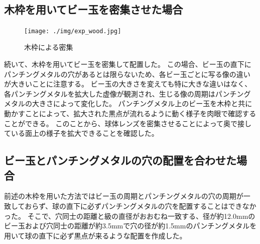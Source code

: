 \begin{figure}[htbp]
  \centering
{}
\\
  \caption{}
  \label{FExpSingle}
\end{figure}

\subsection{木枠を用いてビー玉を密集させた場合}
\label{SSWoodframe}

\begin{figure}[htbp]
  \centering
  \texttt{[image: ./img/exp\_wood.jpg]}
  \caption{木枠による密集}
  \label{FExpWood}
\end{figure}

続いて、木枠を用いてビー玉を密集して配置した。
この場合、ビー玉の直下にパンチングメタルの穴があるとは限らないため、各ビー玉ごとに写る像の違いが大きいことに注意する。
ビー玉の大きさを変えても特に大きな違いはなく、各パンチングメタルを拡大した虚像が観測され、生じる像の周期はパンチングメタルの大きさによって変化した。
パンチングメタル上のビー玉を木枠と共に動かすことによって、拡大された黒点が流れるように動く様子を肉眼で確認することができる。
このことから、球体レンズを密集させることによって奥で接している面上の様子を拡大できることを確認した。

\subsection{ビー玉とパンチングメタルの穴の配置を合わせた場合}
\label{SSMarbleOnHole}
前述の木枠を用いた方法ではビー玉の周期とパンチングメタルの穴の周期が一致しておらず、球の直下に必ずパンチングメタルの穴を配置することはできなかった。
そこで、穴同士の距離と級の直径がおおむね一致する、径が約12.0mmのビー玉および穴同士の距離が約3.5mmで穴の径が約1.5mmのパンチングメタルを用いて球の直下に必ず黒点が来るような配置を作成した。


